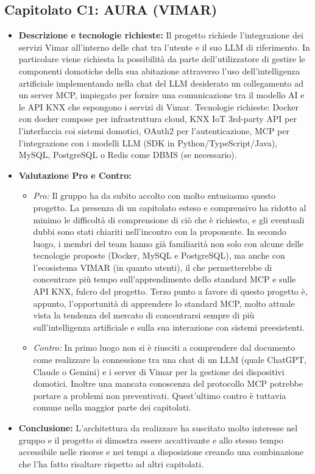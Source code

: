 \documentclass[12pt,a4paper]{article}
\newcommand{\tightlist}{\setlength{\itemsep}{1pt}\setlength{\parskip}{0pt}}
\begin{document}
\hypertarget{capitolato-c1}{%
\subsection{Capitolato C1: AURA (VIMAR)}}
\begin{itemize}
\tightlist
\item \textbf{Descrizione e tecnologie richieste:} Il progetto richiede l'integrazione dei servizi Vimar all’interno delle chat tra l’utente e il suo LLM di riferimento. In particolare viene richiesta la possibilità da parte dell’utilizzatore di gestire le componenti domotiche della sua abitazione attraverso l’uso dell’intelligenza artificiale implementando nella chat del LLM desiderato un collegamento ad un server MCP, impiegato per fornire una comunicazione tra il modello AI e le API KNX che espongono i servizi di Vimar.
Tecnologie richieste:
Docker con docker compose per infrastruttura cloud, KNX IoT 3rd-party API per l’interfaccia coi sistemi domotici, OAuth2 per l’autenticazione, MCP per l’integrazione con i modelli LLM (SDK in Python/TypeScript/Java), MySQL, PostgreSQL o Redis come DBMS (se necessario).

\item \textbf{Valutazione Pro e Contro:}
  \begin{itemize}
  \tightlist
  \item \emph{Pro:} Il gruppo ha da subito accolto con molto entusiasmo questo progetto. La presenza di un capitolato esteso e comprensivo ha ridotto al minimo le difficoltà di comprensione di ciò che è richiesto, e gli eventuali dubbi sono stati chiariti nell’incontro con la proponente.
In secondo luogo, i membri del team hanno già familiarità non solo con alcune delle tecnologie proposte (Docker, MySQL e PostgreSQL), ma anche con l’ecosistema VIMAR (in quanto utenti), il che permetterebbe di concentrare più tempo sull’apprendimento dello standard MCP e sulle API KNX, fulcro del progetto.
Terzo punto a favore di questo progetto è, appunto, l’opportunità di apprendere lo standard MCP, molto attuale vista la tendenza del mercato di concentrarsi sempre di più sull’intelligenza artificiale e sulla sua interazione con sistemi preesistenti.
\item \emph{Contro:} In primo luogo non si è riusciti a comprendere dal documento come realizzare la connessione tra una chat di un LLM (quale ChatGPT, Claude o Gemini) e i server di Vimar per la gestione dei dispositivi domotici. Inoltre una mancata conoscenza del protocollo MCP potrebbe portare a problemi non preventivati. Quest’ultimo contro è tuttavia comune nella maggior parte dei capitolati. 
\end{itemize}
\item \textbf{Conclusione:} L’architettura da realizzare ha suscitato molto interesse nel gruppo e il progetto si dimostra essere accattivante e allo stesso tempo accessibile nelle risorse e nei tempi a disposizione creando una combinazione che l’ha fatto risaltare rispetto ad altri capitolati.
\end{itemize}
\end{document}
